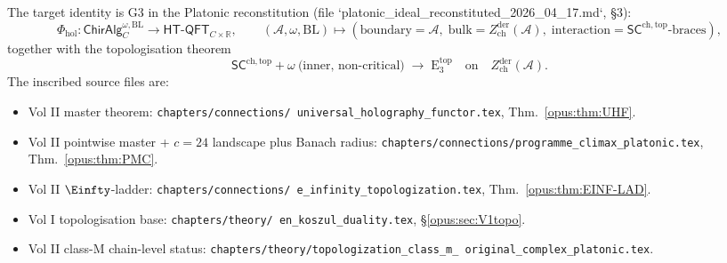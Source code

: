 \documentclass{article}
\theoremstyle{definition}
\theoremstyle{remark}
\newcommand{\SCchtop}{\mathsf{SC}^{\mathrm{ch,top}}}
\newcommand{\Phihol}{\Phi_{\mathrm{hol}}}
\newcommand{\HTQFT}{\mathsf{HT\text{-}QFT}}
\newcommand{\ChirAlg}{\mathsf{ChirAlg}}
\newcommand{\Zder}{Z^{\mathrm{der}}_{\mathrm{ch}}}
\newcommand{\Etop}[1]{\mathrm{E}_{#1}^{\mathrm{top}}}
\newcommand{\cA}{\mathcal{A}}
\begin{document}
The target identity is G3 in the Platonic reconstitution
(file `platonic_ideal_reconstituted_2026_04_17.md`, \S3):
\begin{equation}\label{eq:opus-G3-statement}
  \Phihol\colon \ChirAlg^{\omega,\mathrm{BL}}_C
  \longrightarrow \HTQFT_{C\times\mathbb{R}},
  \qquad
  (\cA,\omega,\mathrm{BL}) \longmapsto
  (\mathrm{boundary}=\cA,\;\mathrm{bulk}=\Zder(\cA),\;
   \mathrm{interaction}=\SCchtop\text{-braces}),
\end{equation}
together with the topologisation theorem
\begin{equation}\label{eq:opus-topologisation}
  \SCchtop + \omega\ \text{(inner, non-critical)}
  \;\longrightarrow\; \Etop{3}
  \quad\text{on}\quad \Zder(\cA).
\end{equation}
The inscribed source files are:
\begin{itemize}
\item Vol II master theorem: \texttt{chapters/connections/%
universal\_holography\_functor.tex},
Thm.~\ref*{opus:thm:UHF}.
\item Vol II pointwise master + $c=24$ landscape plus Banach radius:
\texttt{chapters/connections/programme\_climax\_platonic.tex},
Thm.~\ref*{opus:thm:PMC}.
\item Vol II $\Einfty$-ladder: \texttt{chapters/connections/%
e\_infinity\_topologization.tex}, Thm.~\ref*{opus:thm:EINF-LAD}.
\item Vol I topologisation base: \texttt{chapters/theory/%
en\_koszul\_duality.tex}, \S\ref*{opus:sec:V1topo}.
\item Vol II class-M chain-level status:
\texttt{chapters/theory/topologization\_class\_m\_%
original\_complex\_platonic.tex}.
\end{itemize}
\end{document}

